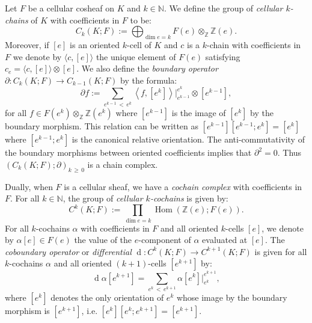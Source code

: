 \documentclass[AHL,Unicode,longabstracts,published]{cedram}
\newcommand{\Z}{\mathbb{Z}}
\newcommand{\N}{\mathbb{N}}
\DeclareMathOperator{\Hom}{Hom}
\DeclareMathOperator{\df}{d}
\begin{document}
\begin{defi}
Let $F$ be a cellular cosheaf on $K$ and $k\in \N$. We define the group of \emph{cellular $k$-chains} of $K$ with coefficients in $F$ to be:
\begin{equation*}
C_k(K;F):=\bigoplus_{\dim e = k} F(e)\otimes_\Z\Z(e).
\end{equation*}
Moreover, if $[e]$ is an oriented $k$-cell of $K$ and $c$ is a $k$-chain with coefficients in $F$ we denote by $\langle c,[e]\rangle$ the unique element of $F(e)$ satisfying $c_e=\langle c,[e]\rangle\otimes [e]$. We also define the \emph{boundary operator} $\partial : C_k(K;F) \rightarrow C_{k-1}(K;F)$ by the formula:
\begin{equation*}
\partial f :=\sum_{e^{k-1}\,<\,e^k} \left\langle f,[e^k]\right\rangle\big|^{e^k}_{e^{k-1}}\otimes \left[e^{k-1}\right],
\end{equation*}
for all $f\in F(e^k)\otimes_\Z\Z(e^k)$ where $[e^{k-1}]$ is the image of $[e^k]$ by the boundary morphism. This relation can be written as ${[e^{k-1}][e^{k-1};e^k]=[e^k]}$ where $[e^{k-1};e^k]$ is the canonical relative orientation. The anti-commutativity of the boundary morphisms between oriented coefficients implies that $\partial^2=0$. Thus $(C_k(K;F);\partial)_{k\,\geq\,0}$ is a chain complex.


Dually, when $F$ is a cellular sheaf, we have a \emph{cochain complex} with coefficients in $F$. For all $k\in \N$, the group of \emph{cellular $k$-cochains} is given by:
\begin{equation*}
C^k(K;F):= \prod_{\dim e = k} \Hom(\Z(e);F(e)).
\end{equation*}
For all $k$-cochains $\alpha$ with coefficients in $F$ and all oriented $k$-cells $[e]$, we denote by $\alpha[e]\in F(e)$ the value of the $e$-component of $\alpha$ evaluated at $[e]$. The \emph{coboundary operator} or \emph{differential} $\df:C^k(K;F)\rightarrow C^{k+1}(K;F)$ is given for all $k$-cochains $\alpha$ and all oriented $(k+1)$-cells $[e^{k+1}]$ by:
\begin{equation*}
\df\alpha\left[e^{k+1}\right]=\sum_{e^k\,<\,e^{k+1}}\alpha\left[e^k\right]\big|^{e^{k+1}}_{e^k},
\end{equation*}
where $[e^k]$ denotes the only orientation of $e^k$ whose image by the boundary morphism is $[e^{k+1}]$, i.e. $[e^k][e^k;e^{k+1}]=[e^{k+1}]$.



\end{defi}
\end{document}
